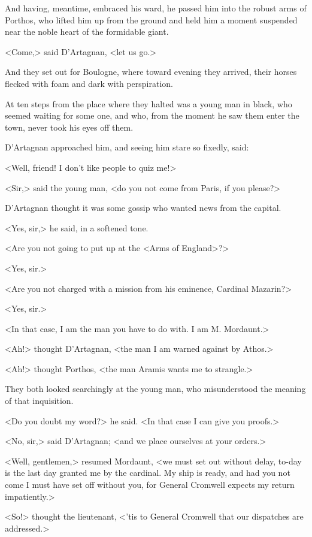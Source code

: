 And having, meantime, embraced his ward, he passed him into the robust arms of Porthos, who lifted him up from the ground and held him a moment suspended near the noble heart of the formidable giant.

<Come,> said D'Artagnan, <let us go.>

And they set out for Boulogne, where toward evening they arrived, their horses flecked with foam and dark with perspiration.

At ten steps from the place where they halted was a young man in black, who seemed waiting for some one, and who, from the moment he saw them enter the town, never took his eyes off them.

D'Artagnan approached him, and seeing him stare so fixedly, said:

<Well, friend! I don't like people to quiz me!>

<Sir,> said the young man, <do you not come from Paris, if you please?>

D'Artagnan thought it was some gossip who wanted news from the capital.

<Yes, sir,> he said, in a softened tone.

<Are you not going to put up at the <Arms of England>?>

<Yes, sir.>

<Are you not charged with a mission from his eminence, Cardinal Mazarin?>

<Yes, sir.>

<In that case, I am the man you have to do with. I am M. Mordaunt.>

<Ah!> thought D'Artagnan, <the man I am warned against by Athos.>

<Ah!> thought Porthos, <the man Aramis wants me to strangle.>

They both looked searchingly at the young man, who misunderstood the meaning of that inquisition.

<Do you doubt my word?> he said. <In that case I can give you proofs.>

<No, sir,> said D'Artagnan; <and we place ourselves at your orders.>

<Well, gentlemen,> resumed Mordaunt, <we must set out without delay, to-day is the last day granted me by the cardinal. My ship is ready, and had you not come I must have set off without you, for General Cromwell expects my return impatiently.>

<So!> thought the lieutenant, <'tis to General Cromwell that our dispatches are addressed.>

